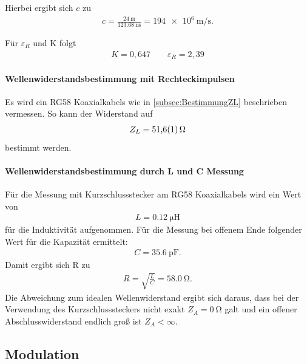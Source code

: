 \documentclass[a4paper,twoside,final]{article}
\begin{document}
Hierbei ergibt sich $c$ zu
\begin{align}
c = \frac{\SI{24}{\metre}}{\SI{123,68}{\nano\second}}= \SI{194e6}{\metre\per\second}.
\end{align}

Für $\varepsilon_R$ und K folgt
\begin{align}
K = 0,647 \qquad \varepsilon_R = 2,39
\end{align}

\paragraph{Wellenwiderstandsbestimmung mit Rechteckimpulsen}
Es wird ein RG58 Koaxialkabels wie in \ref{subsec:BestimmungZL} beschrieben vermessen. So kann der Widerstand auf
\begin{align}
Z_L = \SI{51,6 \pm 0,1}{\ohm}
\end{align}
bestimmt werden.

\paragraph{Wellenwiderstandsbestimmung durch L und C Messung}
Für die Messung mit Kurzschlussstecker am RG58 Koaxialkabels wird ein Wert von
\begin{align}
L = \SI{0,12}{\micro\henry}
\end{align}
für die Induktivität aufgenommen. Für die Messung bei offenem Ende folgender Wert für die Kapazität ermittelt:
\begin{align}
C = \SI{35,6}{\pico\farad}.
\end{align}
Damit ergibt sich R zu
\begin{align}
R = \sqrt{\frac{L}{C}} =  \SI{58,0}{\ohm}.
\end{align}
Die Abweichung zum idealen Wellenwiderstand ergibt sich daraus, dass bei der Verwendung des Kurzschlusssteckers nicht exakt $Z_A = \SI{0}{\ohm}$ galt und ein offener Abschlusswiderstand  endlich groß ist $Z_A < \infty$.
\subsection{Modulation}
\end{document}
